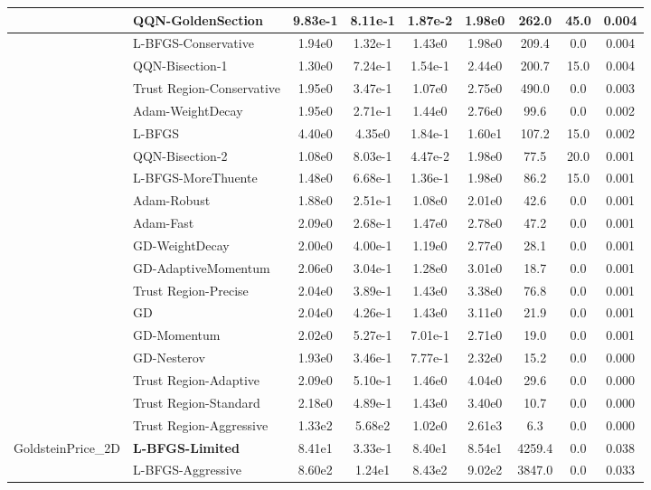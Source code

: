 \documentclass[10pt]{article}
\begin{document}
\begin{longtable}{|l|l|c|c|c|c|c|c|c|}
\hline
 & QQN-GoldenSection & 9.83e-1 & 8.11e-1 & 1.87e-2 & 1.98e0 & 262.0 & 45.0 & 0.004 \\
\hline
 & L-BFGS-Conservative & 1.94e0 & 1.32e-1 & 1.43e0 & 1.98e0 & 209.4 & 0.0 & 0.004 \\
\hline
 & QQN-Bisection-1 & 1.30e0 & 7.24e-1 & 1.54e-1 & 2.44e0 & 200.7 & 15.0 & 0.004 \\
\hline
 & Trust Region-Conservative & 1.95e0 & 3.47e-1 & 1.07e0 & 2.75e0 & 490.0 & 0.0 & 0.003 \\
\hline
 & Adam-WeightDecay & 1.95e0 & 2.71e-1 & 1.44e0 & 2.76e0 & 99.6 & 0.0 & 0.002 \\
\hline
 & L-BFGS & 4.40e0 & 4.35e0 & 1.84e-1 & 1.60e1 & 107.2 & 15.0 & 0.002 \\
\hline
 & QQN-Bisection-2 & 1.08e0 & 8.03e-1 & 4.47e-2 & 1.98e0 & 77.5 & 20.0 & 0.001 \\
\hline
 & L-BFGS-MoreThuente & 1.48e0 & 6.68e-1 & 1.36e-1 & 1.98e0 & 86.2 & 15.0 & 0.001 \\
\hline
 & Adam-Robust & 1.88e0 & 2.51e-1 & 1.08e0 & 2.01e0 & 42.6 & 0.0 & 0.001 \\
\hline
 & Adam-Fast & 2.09e0 & 2.68e-1 & 1.47e0 & 2.78e0 & 47.2 & 0.0 & 0.001 \\
\hline
 & GD-WeightDecay & 2.00e0 & 4.00e-1 & 1.19e0 & 2.77e0 & 28.1 & 0.0 & 0.001 \\
\hline
 & GD-AdaptiveMomentum & 2.06e0 & 3.04e-1 & 1.28e0 & 3.01e0 & 18.7 & 0.0 & 0.001 \\
\hline
 & Trust Region-Precise & 2.04e0 & 3.89e-1 & 1.43e0 & 3.38e0 & 76.8 & 0.0 & 0.001 \\
\hline
 & GD & 2.04e0 & 4.26e-1 & 1.43e0 & 3.11e0 & 21.9 & 0.0 & 0.001 \\
\hline
 & GD-Momentum & 2.02e0 & 5.27e-1 & 7.01e-1 & 2.71e0 & 19.0 & 0.0 & 0.001 \\
\hline
 & GD-Nesterov & 1.93e0 & 3.46e-1 & 7.77e-1 & 2.32e0 & 15.2 & 0.0 & 0.000 \\
\hline
 & Trust Region-Adaptive & 2.09e0 & 5.10e-1 & 1.46e0 & 4.04e0 & 29.6 & 0.0 & 0.000 \\
\hline
 & Trust Region-Standard & 2.18e0 & 4.89e-1 & 1.43e0 & 3.40e0 & 10.7 & 0.0 & 0.000 \\
\hline
 & Trust Region-Aggressive & 1.33e2 & 5.68e2 & 1.02e0 & 2.61e3 & 6.3 & 0.0 & 0.000 \\
GoldsteinPrice\_2D & \textbf{L-BFGS-Limited} & 8.41e1 & 3.33e-1 & 8.40e1 & 8.54e1 & 4259.4 & 0.0 & 0.038 \\
\hline
 & L-BFGS-Aggressive & 8.60e2 & 1.24e1 & 8.43e2 & 9.02e2 & 3847.0 & 0.0 & 0.033 \\

\end{longtable}
\end{document}
